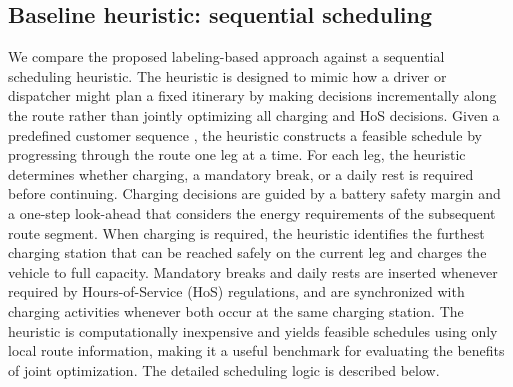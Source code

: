 \documentclass[3p,11pt,authoryear]{elsarticle}  %
\begin{document}

\subsection{Baseline heuristic: sequential scheduling}
\label{sec:baseline_heuristic}


We compare the proposed labeling-based approach against a sequential scheduling heuristic. The heuristic is designed to mimic how a driver or dispatcher might plan a fixed itinerary by making decisions incrementally along the route rather than jointly optimizing all charging and HoS decisions. Given a predefined customer sequence %
, the heuristic constructs a feasible schedule by progressing through the route one leg at a time. For each leg, the heuristic determines whether charging, a mandatory break, or a daily rest is required before continuing. Charging decisions are guided by a battery safety margin and a one-step look-ahead that considers the energy requirements of the subsequent route segment. When charging is required, the heuristic identifies the furthest charging station that can be reached safely on the current leg and charges the vehicle to full capacity. Mandatory breaks and daily rests are inserted whenever required by Hours-of-Service (HoS) regulations, and are synchronized with charging activities whenever both occur at the same charging station. The heuristic is computationally inexpensive and yields feasible schedules using only local route information, making it a useful benchmark for evaluating the benefits of joint optimization. The detailed scheduling logic is described below.
\end{document}
